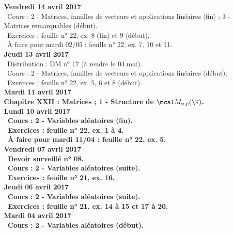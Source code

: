\documentclass[12pt,a4paper]{article}
\begin{document}
 
\noindent\textbf{Vendredi 14 avril 2017}\\
\bu\ Cours : 2 - Matrices, familles de vecteurs et applications linéaires (fin) ; 3 - Matrices 
remarquables (début).\\
\bu\ Exercices : feuille n° 22, ex. 8 (fin) et 9 (début).\\
\bu\ À faire pour mardi 02/05 : feuille n° 22, ex. 7, 10 et 11.\vspace{.4cm}\\

\noindent\textbf{Jeudi 13 avril 2017}\\
\bu\ Distribution : DM n° 17 (à rendre le 04 mai).\\
\bu\ Cours : 2 - Matrices, familles de vecteurs et applications linéaires (début).\\
\bu\ Exercices : feuille n° 22, ex. 5, 6 et 8 (début).\vspace{.4cm}\\

\noindent\textbf{Mardi 11 avril 2017}\\
\bf Chapitre XXII \rm : Matrices ; 1 - Structure de $\mcal M_{n,p}(\K)$.\vspace{.4cm}\\
 
\noindent\textbf{\bf Lundi 10 avril 2017} \\
\bu\ Cours : 2 - Variables aléatoires (fin).\\
\bu\ Exercices : feuille n° 22, ex. 1 à 4.\\
\bu\ À faire pour mardi 11/04 : feuille n° 22, ex. 5.\vspace{.4cm}\\
 
\noindent\textbf{Vendredi 07 avril 2017}\\
\bu\ Devoir surveillé n° 08.\\
\bu\ Cours : 2 - Variables aléatoires (suite).\\
\bu\ Exercices : feuille n° 21, ex. 16.\vspace{.4cm}\\

\noindent\textbf{Jeudi 06 avril 2017}\\
\bu\ Cours : 2 - Variables aléatoires (suite).\\
\bu\ Exercices : feuille n° 21, ex. 14 à 15 et 17 à 20.\vspace{.4cm}\\

\noindent\textbf{Mardi 04 avril 2017}\\
\bu\ Cours : 2 - Variables aléatoires (début).\vspace{.4cm}\\
 
\end{document}
